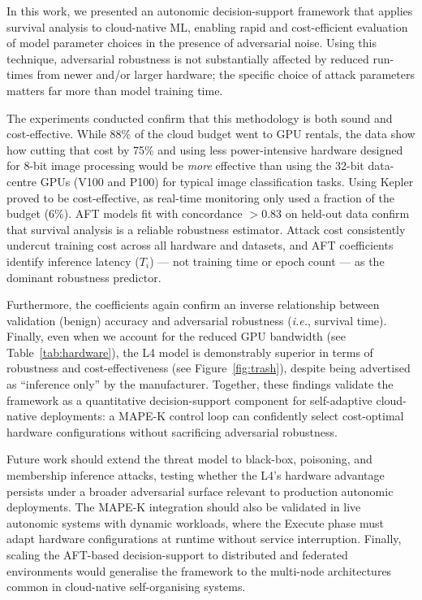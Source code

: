 \documentclass[conference]{IEEEtran}%
\begin{document}
In this work, we presented an autonomic decision-support framework that applies survival analysis to cloud-native ML, enabling rapid and cost-efficient evaluation of model parameter choices in the presence of adversarial noise.
Using this technique, adversarial robustness is not substantially affected by reduced run-times from newer and/or larger hardware; the specific choice of attack parameters matters far more than model training time.

The experiments conducted confirm that this methodology is both sound and cost-effective. While 88\% of the cloud budget went to GPU rentals, the data show how cutting that cost by 75\% and using less power-intensive hardware designed for 8-bit image processing would be \textit{more} effective than using the 32-bit data-centre GPUs (V100 and P100) for typical image classification tasks. 
Using Kepler proved to be cost-effective, as real-time monitoring only used a fraction of the budget (6\%).
AFT models fit with concordance $>0.83$ on held-out data confirm that survival analysis is a reliable robustness estimator. Attack cost consistently undercut training cost across all hardware and datasets, and AFT coefficients identify inference latency ($T_i$) --- not training time or epoch count --- as the dominant robustness predictor.

Furthermore, the coefficients again confirm an inverse relationship between validation (benign) accuracy and adversarial robustness (\textit{i.e.}, survival time).
Finally, even when we account for the reduced GPU bandwidth (see Table~\ref{tab:hardware}), the L4 model is demonstrably superior in terms of robustness and cost-effectiveness (see Figure~\ref{fig:trash}), despite being advertised as ``inference only'' by the manufacturer.
Together, these findings validate the framework as a quantitative decision-support component for self-adaptive cloud-native deployments: a MAPE-K control loop can confidently select cost-optimal hardware configurations without sacrificing adversarial robustness.

Future work should extend the threat model to black-box, poisoning, and membership inference attacks, testing whether the L4's hardware advantage persists under a broader adversarial surface relevant to production autonomic deployments.
The MAPE-K integration should also be validated in live autonomic systems with dynamic workloads, where the Execute phase must adapt hardware configurations at runtime without service interruption.
Finally, scaling the AFT-based decision-support to distributed and federated environments would generalise the framework to the multi-node architectures common in cloud-native self-organising systems.

{}

\end{document}
